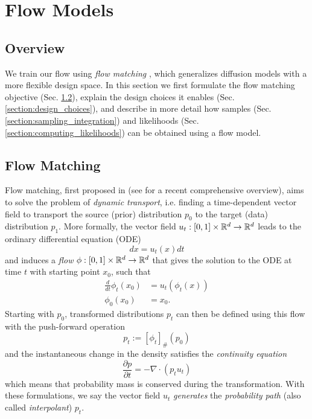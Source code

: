
\chapter{Flow Models}\label{section:flow_models}

\section{Overview}

We train our flow using \textit{flow matching} \citep{lipmanFlowMatchingGenerative2023,albergoStochasticInterpolantsUnifying2023,liuFlowStraightFast2022}, which generalizes diffusion models with a more flexible design space. In this section we first formulate the flow matching objective (Sec. \ref{section:flow_matching}), explain the design choices it enables (Sec. \ref{section:design_choices}), and describe in more detail how samples (Sec. \ref{section:sampling_integration}) and likelihoods (Sec. \ref{section:computing_likelihoods}) can be obtained using a flow model. 

\section{Flow Matching} \label{section:flow_matching}

Flow matching, first proposed in \citep{lipmanFlowMatchingGenerative2023,albergoStochasticInterpolantsUnifying2023,liuFlowStraightFast2022} (see \citep{lipmanFlowMatchingGuide2024} for a recent comprehensive overview), aims to solve the problem of \textit{dynamic transport}, i.e. finding a time-dependent vector field to transport the source (prior) distribution $p_0$ to the target (data) distribution $p_1$. More formally, the vector field $u_t: [0,1] \times \mathbb{R}^d \to \mathbb{R}^d$ leads to the ordinary differential equation (ODE)
\begin{equation} \label{eq:ode}
    dx = u_t(x) dt
\end{equation}
and induces a \textit{flow} $\phi: [0,1] \times \mathbb{R}^d \to \mathbb{R}^d$ that gives the solution to the ODE at time $t$ with starting point $x_0$, such that 
\begin{align}
    \frac{d}{dt} \phi_t(x_0) &= u_t(\phi_t(x)) \\
    \phi_0(x_0) &= x_0.
\end{align}
Starting with $p_0$, transformed distributions $p_t$ can then be defined using this flow with the push-forward operation
\begin{equation}
    p_t := [\phi_t]_\# (p_0)
\end{equation} 
and the instantaneous change in the density satisfies the \textit{continuity equation}
\begin{equation}
    \frac{\partial p}{\partial t} = - \nabla \cdot (p_t u_t)
\end{equation}
which means that probability mass is conserved during the transformation. With these formulations, we say the vector field $u_t$ \textit{generates} the \textit{probability path} (also called \textit{interpolant}) $p_t$.

